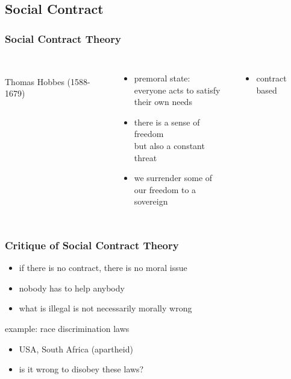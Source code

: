 \documentclass[dvipsnames]{beamer}
\theoremstyle{plain}
\begin{document}
\subsection{Social Contract}

\begin{frame}
  \frametitle{Social Contract Theory}

  \begin{columns}
    \begin{center}
      \\
      Thomas Hobbes (1588-1679)
    \end{center}

    \pause
    \begin{itemize}
      \item premoral state:\\
        everyone acts to satisfy\\
        their own needs
      \item there is a sense of freedom\\
        but also a constant threat
      \item we surrender some of\\
        our freedom to a sovereign
    \end{itemize}

    \begin{itemize}
      \item contract based
    \end{itemize}
  \end{columns}
\end{frame}

\begin{frame}
  \frametitle{Critique of Social Contract Theory}

  \begin{itemize}
    \item if there is no contract, there is no moral issue
    \item nobody has to help anybody

    \pause
    \medskip
    \item what is illegal is not necessarily morally wrong
  \end{itemize}

  \begin{exampleblock}{example: race discrimination laws}
    \begin{itemize}
      \item USA, South Africa (apartheid)
      \item is it wrong to disobey these laws?
    \end{itemize}
  \end{exampleblock}
\end{frame}
\end{document}
